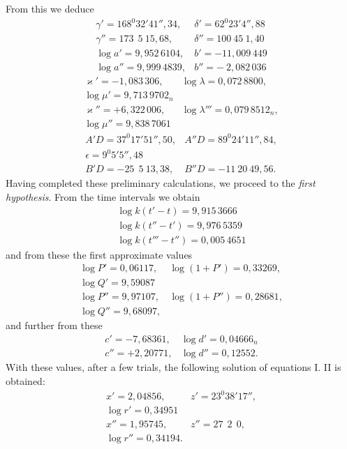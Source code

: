 From this we deduce
\[
\begin{array}{ll}
\gamma' = 168^{0}32'41''{,}34, & \delta' = 62^{0}23'4''{,}88 \\
\gamma'' = 173\ \ 5\ 15{,}68, & \delta'' = 100\ 45\ 1{,}40 \\
\log a' = 9{,}952\,6104, & b' = -11{,}009\,449 \\
\log a'' = 9{,}999\,4839, & b'' = -\ 2{,}082\,036
\end{array}
\]
\[
\begin{array}{ll}
\varkappa' = -1{,}083\,306, & \log \lambda = 0{,}072\,8800,\\
\log \mu' = 9{,}713\,9702_n & \\
\varkappa'' = +6{,}322\,006, & \log \lambda''' = 0{,}079\,8512_n,\\
\log \mu'' = 9{,}838\,7061 & 
\end{array}
\]
\[
\begin{array}{ll}
A'D = 37^{0}17'51''{,}50, & A''D = 89^{0}24'11''{,}84,\\
\epsilon = 9^{0}5'5''{,}48 & \\
B'D = -25\ \ 5\ 13{,}38, & B''D = -11\ 20\ 49{,}56.
\end{array}
\]
Having completed these preliminary calculations, we proceed to the \emph{first hypothesis}. From the
time intervals we obtain
\[
\begin{array}{l}
\log k(t'-t) = 9{,}915\,3666 \\
\log k(t''-t') = 9{,}976\,5359 \\
\log k(t'''-t'') = 0{,}005\,4651
\end{array}
\]
and from these the first approximate values
\[
\begin{array}{ll}
\log P' = 0{,}06117, & \log(1+P') = 0{,}33269,\\
\log Q' = 9{,}59087 & \\
\log P'' = 9{,}97107, & \log(1+P'') = 0{,}28681,\\
\log Q'' = 9{,}68097, & 
\end{array}
\]
and further from these
\[
\begin{array}{ll}
c' = -7{,}68361, & \log d' = 0{,}04666_n \\
c'' = +2{,}20771, & \log d'' = 0{,}12552.
\end{array}
\]
With these values, after a few trials, the following solution of equations I. II
is obtained:
\[
\begin{array}{ll}
x' = 2{,}04856, & z' = 23^{0}38'17'',\\
\log r' = 0{,}34951 & \\
x'' = 1{,}95745, & z'' = 27\ \ 2\ \ 0,\\
\log r'' = 0{,}34194. & 
\end{array}
\]
